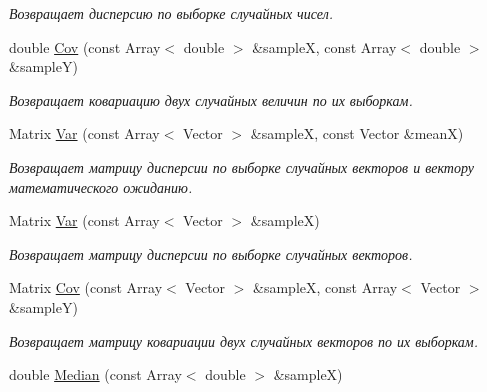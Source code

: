 \begin{DoxyCompactItemize}
\begin{DoxyCompactList}\small\item\em Возвращает дисперсию по выборке случайных чисел. \end{DoxyCompactList}\item 
double \hyperlink{namespace_math_1_1_statistic_a82c94ccceb182ae0c07623a0d3e07269}{Cov} (const Array$<$ double $>$ \&sampleX, const Array$<$ double $>$ \&sampleY)\hypertarget{namespace_math_1_1_statistic_a82c94ccceb182ae0c07623a0d3e07269}{}\label{namespace_math_1_1_statistic_a82c94ccceb182ae0c07623a0d3e07269}

\begin{DoxyCompactList}\small\item\em Возвращает ковариацию двух случайных величин по их выборкам. \end{DoxyCompactList}\item 
Matrix \hyperlink{namespace_math_1_1_statistic_ac7aadd8aab31379cc285d74a5f30e1bf}{Var} (const Array$<$ Vector $>$ \&sampleX, const Vector \&meanX)\hypertarget{namespace_math_1_1_statistic_ac7aadd8aab31379cc285d74a5f30e1bf}{}\label{namespace_math_1_1_statistic_ac7aadd8aab31379cc285d74a5f30e1bf}

\begin{DoxyCompactList}\small\item\em Возвращает матрицу дисперсии по выборке случайных векторов и вектору математического ожиданию. \end{DoxyCompactList}\item 
Matrix \hyperlink{namespace_math_1_1_statistic_af18d9a832496607b0be9a47cc2349e00}{Var} (const Array$<$ Vector $>$ \&sampleX)\hypertarget{namespace_math_1_1_statistic_af18d9a832496607b0be9a47cc2349e00}{}\label{namespace_math_1_1_statistic_af18d9a832496607b0be9a47cc2349e00}

\begin{DoxyCompactList}\small\item\em Возвращает матрицу дисперсии по выборке случайных векторов. \end{DoxyCompactList}\item 
Matrix \hyperlink{namespace_math_1_1_statistic_a10cb1e6659e27127bd4b7d2ca19deb37}{Cov} (const Array$<$ Vector $>$ \&sampleX, const Array$<$ Vector $>$ \&sampleY)\hypertarget{namespace_math_1_1_statistic_a10cb1e6659e27127bd4b7d2ca19deb37}{}\label{namespace_math_1_1_statistic_a10cb1e6659e27127bd4b7d2ca19deb37}

\begin{DoxyCompactList}\small\item\em Возвращает матрицу ковариации двух случайных векторов по их выборкам. \end{DoxyCompactList}\item 
double \hyperlink{namespace_math_1_1_statistic_a6f485f591ba03413dc10ca85d1d3bf45}{Median} (const Array$<$ double $>$ \&sampleX)\hypertarget{namespace_math_1_1_statistic_a6f485f591ba03413dc10ca85d1d3bf45}{}\label{namespace_math_1_1_statistic_a6f485f591ba03413dc10ca85d1d3bf45}


\end{DoxyCompactItemize}
